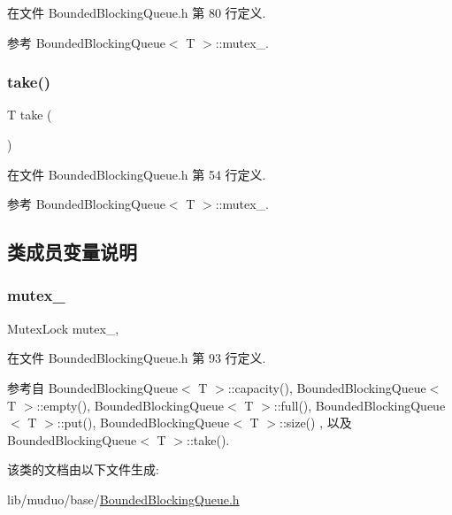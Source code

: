 在文件 Bounded\+Blocking\+Queue.\+h 第 80 行定义.



参考 Bounded\+Blocking\+Queue$<$ T $>$\+::mutex\+\_\+.

\mbox{\label{classmuduo_1_1BoundedBlockingQueue_a926c690dfed431d9d806584f3d996e07}} 
\subsubsection{\texorpdfstring{take()}{take()}}
{\footnotesize\ttfamily T take (\begin{DoxyParamCaption}{ }\end{DoxyParamCaption})\hspace{0.3cm}{\ttfamily [inline]}}



在文件 Bounded\+Blocking\+Queue.\+h 第 54 行定义.



参考 Bounded\+Blocking\+Queue$<$ T $>$\+::mutex\+\_\+.



\subsection{类成员变量说明}
\mbox{\label{classmuduo_1_1BoundedBlockingQueue_a6e1bf1809a42f40f1a21178dc6620a6f}} 
\subsubsection{\texorpdfstring{mutex\+\_\+}{mutex\_}}
{\footnotesize\ttfamily Mutex\+Lock mutex\+\_\+\hspace{0.3cm}{\ttfamily [mutable]}, {\ttfamily [private]}}



在文件 Bounded\+Blocking\+Queue.\+h 第 93 行定义.



参考自 Bounded\+Blocking\+Queue$<$ T $>$\+::capacity(), Bounded\+Blocking\+Queue$<$ T $>$\+::empty(), Bounded\+Blocking\+Queue$<$ T $>$\+::full(), Bounded\+Blocking\+Queue$<$ T $>$\+::put(), Bounded\+Blocking\+Queue$<$ T $>$\+::size() , 以及 Bounded\+Blocking\+Queue$<$ T $>$\+::take().



该类的文档由以下文件生成\+:\begin{DoxyCompactItemize}
\item 
lib/muduo/base/\hyperlink{BoundedBlockingQueue_8h}{Bounded\+Blocking\+Queue.\+h}\end{DoxyCompactItemize}
